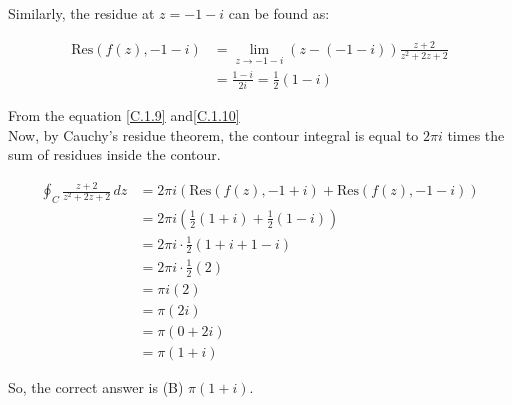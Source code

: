 \documentclass[journal,12pt,twocolumn]{IEEEtran}
\theoremstyle{remark}
\begin{document}
Similarly, the residue at $z = -1 - i$ can be found as:

\begin{align}
\text{Res}(f(z), -1-i) &= \lim_{z \to -1-i} (z - (-1-i))\frac{z + 2}{z^2 + 2z + 2} \\
&= \frac{1-i}{2i} = \frac{1}{2}(1-i)
\end{align}

From the equation \eqref{C.1.9} and\eqref{C.1.10}\\
Now, by Cauchy's residue theorem, the contour integral is equal to $2\pi i$ times the sum of residues inside the contour.

\begin{align}
\oint_C \frac{z + 2}{z^2 + 2z + 2} \, dz &= 2\pi i \left(\text{Res}(f(z), -1+i) + \text{Res}(f(z), -1-i)\right) \\
&= 2\pi i \left(\frac{1}{2}(1+i) + \frac{1}{2}(1-i)\right) \\
&= 2\pi i \cdot \frac{1}{2}(1+i+1-i) \\
&= 2\pi i \cdot \frac{1}{2}(2) \\
&= \pi i (2) \\
&= \pi (2i) \\
&= \pi (0 + 2i) \\
&= \pi (1 + i)
\end{align}

So, the correct answer is (B) $\pi(1 + i)$.
\end{document}
